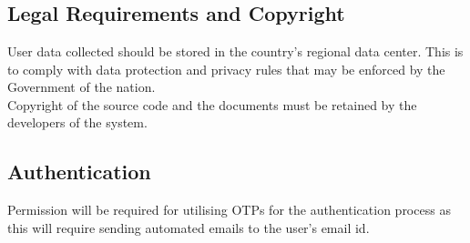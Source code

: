 \documentclass[11pt]{article}
\begin{document}
\newpage
\section{}
\subsection{Legal Requirements and Copyright}
User data collected should be stored in the country’s regional data center. This is to comply with data protection and privacy rules that may be enforced by the Government of the nation. 
\\
Copyright of the source code and the documents must be retained by the developers of the system.

\subsection{Authentication}
Permission will be required for utilising OTPs for the authentication process as this will require sending automated emails to the user's email id. 
\end{document}
